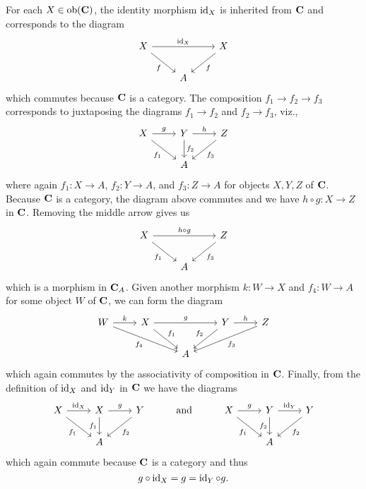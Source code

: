 \begin{example}
    For each \(X \in \operatorname{ob}(\mathbf{\mathbf{C}})\), the identity morphism \(\operatorname{id}_X\) is
    inherited from \(\mathbf{C}\) and corresponds to the diagram
    \[
        \begin{tikzcd}
            X \arrow[rr, "\id_X"] \arrow[rd, "f"'] &   & X \arrow[ld, "f"]\\
                                                                    & A &
        \end{tikzcd}
    \]
    which commutes because \(\mathbf{C}\) is a category. The composition \(f_1 \to
    f_2 \to f_3\) corresponds to juxtaposing the diagrams \(f_1 \to f_2\) and
    \(f_2 \to f_3\), viz.,
    \[
        \begin{tikzcd}
            X \arrow[rd, "f_1"'] \arrow[r, "g"] & Y \arrow[d, "f_2"] \arrow[r, "h"] & Z \arrow[ld, "f_3"] \\
            & A &                    
        \end{tikzcd}
    \]
    where again \(f_1: X \to A\), \(f_2: Y \to A\), and \(f_3: Z \to A\) for
    objects \(X, Y, Z\) of \(\mathbf{C}\). Because \(\mathbf{C}\) is a category, the
    diagram above commutes and we have \(h \circ g : X \to Z\) in \(\mathbf{C}\).
    Removing the middle arrow gives us
    \[
        \begin{tikzcd}
            X \arrow[rr, "h \circ g"] \arrow[rd, "f_1"'] &   & Z \arrow[ld, "f_3"] \\
                                                                    & A &
        \end{tikzcd}
    \]
    which is a morphism in \(\mathbf{C}_A\). Given another morphism \(k : W \to
    X\) and \(f_4 : W \to A\) for some object \(W\) of \(\mathbf{C}\), we can form
    the diagram
    \[
        \begin{tikzcd}
            W   \arrow[rrd, "f_4"']
                \arrow[r, "k"]
            & X \arrow[rd, "f_1"]
                \arrow[rr, "g"]&   & Y \arrow[ld, "f_2"'] \arrow[r, "h"] & Z \arrow[lld, "f_3"] \\
                & & A & &                     
        \end{tikzcd}
    \]
    which again commutes by the associativity of composition in \(\mathbf{C}\).
    Finally, from the definition of \(\operatorname{id}_X\) and \(\operatorname{id}_Y\) in \(\mathbf{C}\) we
    have the diagrams
    \[
        \begin{tikzcd}
            X \arrow[rd, "f_1"']
            \arrow[r, "\id_X"] &
            X \arrow[d, "f_1"']
            \arrow[r, "g"] & Y \arrow[ld, "f_2"] & \text{and}  & X \arrow[r, "g"] \arrow[rd, "f_1"'] & Y \arrow[r, "\id_Y"] \arrow[d, "f_2"'] & Y \arrow[ld, "f_2"] \\
                                                    & A                                  &                     &  &                                     & A                                      &                    
            \end{tikzcd}
    \]
    which again commute because \(\mathbf{C}\) is a category and thus
    \[
        g \circ \operatorname{id}_X = g = \operatorname{id}_Y \circ g.
    \]
    

\end{example}
